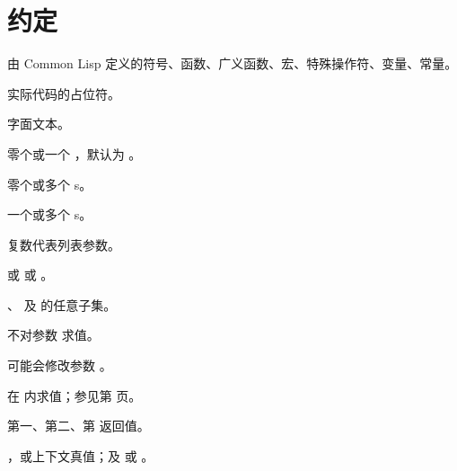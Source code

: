 %
%
\section*{约定}

\begin{LIST}{1cm}

  {
  由 Common Lisp 定义的符号、函数、广义函数、宏、特殊操作符、变量、常量。
  }

  {
  实际代码的占位符。
  }

  {
  字面文本。
  }

  {
  零个或一个 ，默认为 。
  }

  {
  零个或多个 s。
  }

  {
  一个或多个 s。
  }

  {
  复数代表列表参数。
  }

  {
   或  或 。
  }

  {
  、 及  的任意子集。
  }

  {
  不对参数  求值。
  }

  {
  可能会修改参数 。
  }

  {
   在  内求值；参见第 \pageref{:progn} 页。
  }

  {
  第一、第二、第  返回值。
  }

  \IT{\T; \NIL\qquad\qquad\qquad}
  {
  ，或上下文真值；及  或 \kwd{()}。
  }
  
\end{LIST}

